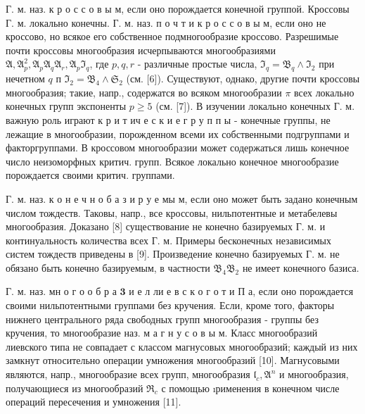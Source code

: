 \documentclass[10pt]{article}
\begin{document}
Г. м. наз. к р о с с о в ы м, если оно порождается конечной группой. Кроссовы Г. м. локально конечны. Г. м. наз. п о ч т и к р о с с о в ы м, если оно не кроссово, но всякое его собственное подмногообразие кроссово. Разрешимые почти кроссовы многообразия исчерпываются многообразиями $\mathfrak{A}, \mathfrak{A}_{p}^{2}, \mathfrak{A}_{p} \mathfrak{A}_{q} \mathfrak{A}_{r}, \mathfrak{A}_{p} \mathfrak{I}_{q}$, где $p, q, r$ - различные простые числа, $\mathfrak{I}_{q}=\mathfrak{B}_{q} \wedge \mathfrak{I}_{2}$ при нечетном $q$ п $\mathfrak{I}_{2}=\mathfrak{B}_{4} \wedge \mathfrak{S}_{2}$ (см. [6]). Существуют, однако, другие почти кроссовы многообразия; такие, напр., содержатся во всяком многообразии $\mathfrak{\pi}$ всех локально конечных групп экспоненты $p \geqslant 5$ (см. [7]). В изучении локально конечных Г. м. важную роль играют к р и т ич е с к и е г р у п п ы - конечные группы, не лежащие в многообразии, порожденном всеми их собственными подгруппами и факторгруппами. В кроссовом многообразии может содержаться лишь конечное число неизоморфных критич. групп. Всякое локально конечное многообразие порождается своими критич. группами.



Г. м. наз. к о н е ч н о б а з и р у е мы м, если оно может быть задано конечным числом тождеств. Таковы, напр., все кроссовы, нильпотентные и метабелевы многообразия. Доказано [8] существование не конечно базируемых Г. м. и континуальность количества всех Г. м. Примеры бесконечных независимых систем тождеств приведены в [9]. Произведение конечно базируемых Г. м. не обязано быть конечно базируемым, в частности $\mathfrak{B}_{4} \mathfrak{B}_{2}$ не имеет конечного базиса.



Г. м. наз. мн о г о о б р а $\mathbf{3}$ и е л ли е в с к о г о т и П а, если оно порождается своими нильпотентными группами без кручения. Если, кроме того, факторы нижнего центрального ряда свободных групп многообразия - группы без кручения, то многообразие наз. м а г н у с о в ы м. Класс многообразий лиевского типа не совпадает с классом магнусовых многообразий; каждый из них замкнут относительно операции умножения многообразий [10]. Магнусовыми являются, напр., многообразие всех групп, многообразия $\mathfrak{l}_{c}, \mathfrak{A}^{n}$ и многообразия, получающиеся из многообразий $\mathfrak{\Re}_{c}$ с помощью ıрименения в конечном числе операций пересечения и умножения [11].
\end{document}
